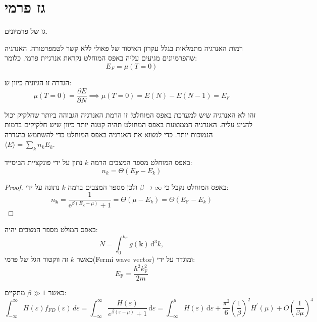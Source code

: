 \documentclass{tstextbook}
\begin{document}
\section{גז פרמי}

\begin{definition}[גז פרמי]
גז של פרמיונים.

\end{definition}
\begin{definition}
רמות האנרגיה מתמלאות בגלל עקרון האיסור של פאולי ללא קשר לטמפרטורה. האנרגיה שהפרמיונים מגיעים עליה באפס המוחלט נקראת אנרגיית פרמי. כלומר:
$$E_{F}=\mu(T=0)$$

\end{definition}
\begin{remark}
הגדרה זו הגיונית כיוון ש:
$$\mu(T=0)=\frac{\partial E}{\partial N} \implies \mu(T=0)=E(N)-E(N-1)=E_{F}$$

\end{remark}
\begin{remark}
זהו לא האנרגיה שיש למערכת באפס המוחלט! זו הרמת האנרגיה הגבוהה ביותר שחלקיק יכול להגיע עליה. האנרגיה הממוצעת באפס המחולט תהיה קטנה יותר כיוון שיש חלקיקים ברמות הנמוכות יותר. כדי למצוא את האנרגיה באפס המוחלט כדי להשתמש בהגדרה \(\langle E \rangle=\sum_{k}n_{k}E_{k}\).

\end{remark}
\begin{proposition}
באפס המוחלט מספר המצבים הרמה \(k\) נתון על ידי פונקציית הביסייד:
$$n_{k}=\Theta(E_{F}-E_{k})$$

\end{proposition}
\begin{proof}
באפס המוחלט נקבל כי \(\beta\to \infty\) ולכן מספר המצבים ברמה \(k\) נתונה על ידי:
$$n_{\mathbf{k}}={\frac{1}{\mathrm{e}^{\beta(E_{\mathbf{k}}-\mu)}+1}}=\Theta(\mu-E_{k})=\Theta(E_{\mathrm{F}}-E_{k})$$

\end{proof}
\begin{corollary}
באפס המולט מספר המצבים יהיה:
$$N=\int_{0}^{k_{\mathrm{F}}}g({\boldsymbol{k}})\,\mathrm{d}^{3}k,$$
כאשר \(k\) זה ווקטור הגל של פרמי(Fermi wave vector) ומוגדר על ידי:
$$E_{\mathrm{F}}={\frac{\hbar^{2}k_{\mathrm{F}}^{2}}{2m}}$$

\end{corollary}
\begin{proposition}
כאשר \(\beta\gg 1\) מתקיים:
$$\int_{-\infty}^{\infty} H\left( \varepsilon \right)f_{FD}\left( \varepsilon \right) \, d\varepsilon = \int_{-\infty}^{\infty}{\frac{H\left( \varepsilon \right)}{e^{\beta\left( \varepsilon-\mu \right)}+1}}\,\mathrm{d}\varepsilon=\int_{-\infty}^{\mu}H\left( \varepsilon \right)\,\mathrm{d}\varepsilon+{\frac{\pi^{2}}{6}}\left({\frac{1}{\beta}}\right)^{2}H^{\prime}\left( \mu \right)+O\left({\frac{1}{\beta\mu}}\right)^{4}$$

\end{proposition}
\end{document}
